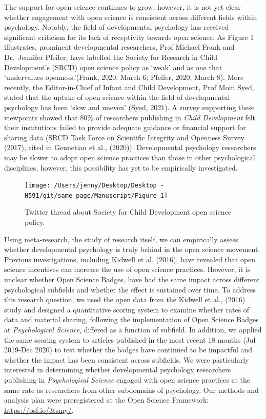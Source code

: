 \documentclass[
  english,
  man,floatsintext]{apa6}
\begin{document}
The support for open science continues to grow, however, it is not yet clear whether engagement with open science is consistent across different fields within psychology. Notably, the field of developmental psychology has received significant criticism for its lack of receptivity towards open science. As Figure 1 illustrates, prominent developmental researchers, Prof Michael Frank and Dr.~Jennifer Pfeifer, have labelled the Society for Research in Child Development's (SRCD) open science policy as `weak' and as one that `undervalues openness.'(Frank, 2020, March 6; Pfeifer, 2020, March 8). More recently, the Editor-in-Chief of Infant and Child Development, Prof Moin Syed, stated that the uptake of open science within the field of developmental psychology has been `slow and uneven' (Syed, 2021). A survey supporting these viewpoints showed that 80\% of researchers publishing in \emph{Child Development} felt their institutions failed to provide adequate guidance or financial support for sharing data (SRCD Task Force on Scientific Integrity and Openness Survey (2017), cited in Gennetian et al., (2020)). Developmental psychology researchers may be slower to adopt open science practices than those in other psychological disciplines, however, this possibility has yet to be empirically investigated.

\begin{figure}

{\centering \texttt{[image: /Users/jenny/Desktop/Desktop - N591/git/same\_page/Manuscript/Figure 1]} 

}

\caption{Twitter thread about Society for Child Development open science policy.}\label{fig:unnamed-chunk-1}
\end{figure}

Using meta-research, the study of research itself, we can empirically assess whether developmental psychology is truly behind in the open science movement. Previous investigations, including Kidwell et al. (2016), have revealed that open science incentives can increase the use of open science practices. However, it is unclear whether Open Science Badges, have had the same impact across different psychological subfields and whether the effect is sustained over time. To address this research question, we used the open data from the Kidwell et al., (2016) study and designed a quantitative scoring system to examine whether rates of data and material sharing, following the implementation of Open Science Badges at \emph{Psychological Science}, differed as a function of subfield. In addition, we applied the same scoring system to articles published in the most recent 18 months (Jul 2019-Dec 2020) to test whether the badges have continued to be impactful and whether the impact has been consistent across subfields. We were particularly interested in determining whether developmental psychology researchers publishing in \emph{Psychological Science} engaged with open science practices at the same rate as researchers from other subdomains of psychology. Our methods and analysis plan were preregistered at the Open Science Framework: \url{https://osf.io/3tsmy/}.
\end{document}
